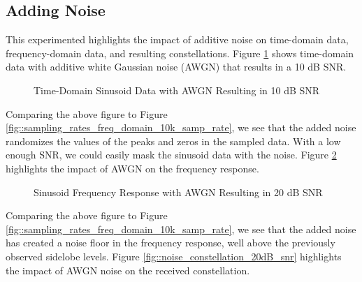 \documentclass{article}
\begin{document}
\subsection{Adding Noise}

This experimented highlights the impact of additive noise on time-domain data, frequency-domain data, and resulting constellations. Figure \ref{fig::noise_time_domain_10dB_snr} shows time-domain data with additive white Gaussian noise (AWGN) that results in a 10 dB SNR.

\begin{figure}[H]
	\centerline{}
	\caption{Time-Domain Sinusoid Data with AWGN Resulting in 10 dB SNR}
	\label{fig::noise_time_domain_10dB_snr}
\end{figure}

Comparing the above figure to Figure \ref{fig::sampling_rates_freq_domain_10k_samp_rate}, we see that the added noise randomizes the values of the peaks and zeros in the sampled data. With a low enough SNR, we could easily mask the sinusoid data with the noise. Figure \ref{fig::noise_freq_domain_20dB_snr} highlights the impact of AWGN on the frequency response.

\begin{figure}[H]
	\centerline{}
	\caption{Sinusoid Frequency Response with AWGN Resulting in 20 dB SNR}
	\label{fig::noise_freq_domain_20dB_snr}
\end{figure}

Comparing the above figure to Figure \ref{fig::sampling_rates_freq_domain_10k_samp_rate}, we see that the added noise has created a noise floor in the frequency response, well above the previously observed sidelobe levels. Figure \ref{fig::noise_constellation_20dB_snr} highlights the impact of AWGN noise on the received constellation.
\end{document}
